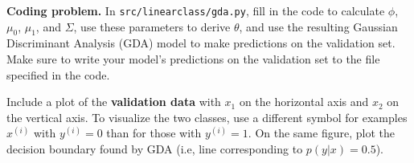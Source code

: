 \newpage

\item {} \textbf{Coding problem.}
In \texttt{src/linearclass/gda.py}, fill in the code to
calculate $\phi$, $\mu_{0}$, $\mu_{1}$, and $\Sigma$, use these parameters
to derive $\theta$, and use the resulting Gaussian Discriminant Analysis (GDA) model to make predictions on the
validation set. Make sure to write your model's predictions on
the validation set to the file specified in the code.

Include a plot of the \textbf{validation data} with $x_1$ on the horizontal axis and $x_2$ on the vertical axis.
To visualize the two classes, use a different symbol for examples $x^{(i)}$
with $y^{(i)} = 0$ than for those with $y^{(i)} = 1$. On the same figure, plot the decision boundary
found by GDA (i.e, line corresponding to $p(y|x) = 0.5$).

